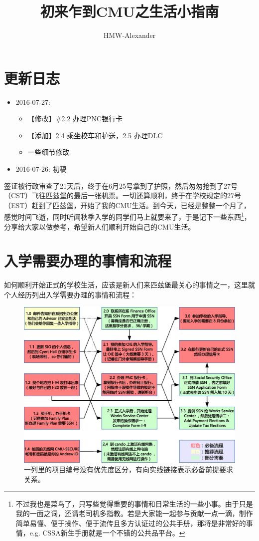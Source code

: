 \documentclass[letterpaper,10pt]{article}
\title{\textbf{初来乍到CMU之生活小指南}}
\author{HMW-Alexander}
\begin{document}
	\maketitle
		
	\tableofcontents
	\section*{更新日志}
	
	\begin{itemize}
		\item 2016-07-27:
		\begin{itemize}
			\item 【修改】\#2.2 办理PNC银行卡
			\item 【添加】2.4 乘坐校车和护送，2.5 办理DLC
			\item  一些细节修改
		\end{itemize}
		\item 2016-07-26: 初稿
	\end{itemize}
	
	\newpage
	
	签证被行政审查了21天后，终于在6月25号拿到了护照，然后匆匆抢到了27号（CST）飞往匹兹堡的最后一张机票。一切还算顺利，终于在学校规定的27号（EST）赶到了匹兹堡，开始了我的CMU生活。到今天，已经是整整一个月了，感觉时间飞逝，同时听闻秋季入学的同学们马上就要来了，于是记下一些东西\footnote{不过我也是菜鸟了，只写些觉得重要的事情和日常生活的一些小事。由于只是我的一面之词，还请老司机多指教。若是大家能一起参与贡献一点一滴，制作简单易懂、便于操作、便于流传且多方认证过的公共手册，那将是非常好的事情，e.g. CSSA新生手册就是一个不错的公共品平台。}，分享给大家以做参考，希望新人们顺利开始自己的CMU生活。
	
	\section{入学需要办理的事情和流程}
	
	如何顺利开始正式的学校生活，应该是新人们来匹兹堡最关心的事情之一，这里就个人经历列出入学需要办理的事情和流程：
	
	\begin{figure}[!h]
		\centering
		\includegraphics[width=\textwidth]{./img/flowchart}
		\caption{一列里的项目编号没有优先度区分，有向实线链接表示必备前提要求关系。}
		\label{fig:flowchart}
	\end{figure}
	
\end{document}
